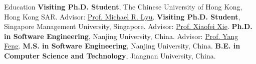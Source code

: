 \begin{rubric}{Education}
\entry*[2026.10 -- Present]%
	\textbf{Visiting Ph.D. Student}, The Chinese University of Hong Kong, Hong Kong SAR.\newline
	Advisor: \href{https://www.cse.cuhk.edu.hk/lyu/home}{Prof. Michael R. Lyu}.
%
\entry*[2025.09 -- 2026.09]%
	\textbf{Visiting Ph.D. Student}, Singapore Management University, Singapore.\newline
	Advisor: \href{https://xiaofeixie.bitbucket.io}{Prof. Xiaofei Xie}.
%
\entry*[2024.09 -- Present]%
	\textbf{Ph.D. in Software Engineering}, Nanjing University, China.\newline
	Advisor: \href{https://fengyang-nju.github.io/}{Prof. Yang Feng}.
%
\entry*[2022.09 -- 2024.06]%
	\textbf{M.S. in Software Engineering}, Nanjing University, China.
% 
\entry*[2018.09 -- 2022.06]%
	\textbf{B.E. in Computer Science and Technology}, Jiangnan University, China.
\end{rubric}
